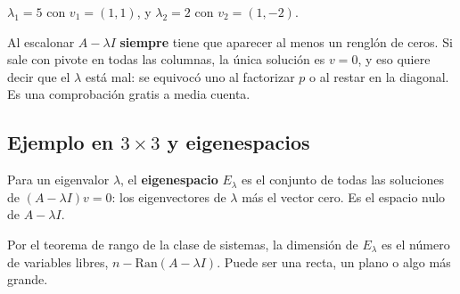 \documentclass[11pt,letterpaper]{article}
\begin{document}
\begin{resultado}
    $\lambda_1 = 5$ con $v_1 = (1, 1)$, y $\lambda_2 = 2$ con
    $v_2 = (1, -2)$.
\end{resultado}

\begin{ojo}
    Al escalonar $A - \lambda I$ \textbf{siempre} tiene que aparecer
    al menos un renglón de ceros. Si sale con pivote en todas las
    columnas, la única solución es $v = 0$, y eso quiere decir que el
    $\lambda$ está mal: se equivocó uno al factorizar $p$ o al restar
    en la diagonal. Es una comprobación gratis a media cuenta.
\end{ojo}


\subsection*{Ejemplo en $3 \times 3$ y eigenespacios}

\begin{definicion}[Eigenespacio]
    Para un eigenvalor $\lambda$, el \textbf{eigenespacio}
    $E_\lambda$ es el conjunto de todas las soluciones de
    $(A - \lambda I)v = 0$: los eigenvectores de $\lambda$ más el
    vector cero. Es el espacio nulo de $A - \lambda I$.
\end{definicion}

Por el teorema de rango de la clase de sistemas, la dimensión de
$E_\lambda$ es el número de variables libres,
$n - \mathrm{Ran}(A - \lambda I)$. Puede ser una recta, un plano o
algo más grande.
\end{document}
